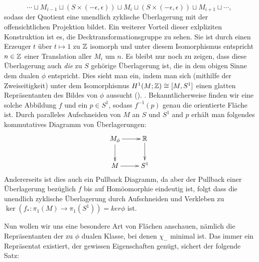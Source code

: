 \begin{bem}
	\[
		\cdots \sqcup M_{i-1} \sqcup (S \times (-\epsilon,\epsilon)) \sqcup M_i \sqcup  (S \times (-\epsilon,\epsilon)) \sqcup M_{i+1} \sqcup \cdots,
	\]
	sodass der Quotient eine unendlich zyklische Überlagerung mit der offensichtlichen Projektion bildet. Ein weiterer Vorteil dieser exlpliziten Konstruktion ist es, die Decktransformationsgruppe zu sehen. Sie ist durch einen Erzeuger $t$ über $t\mapsto 1$ zu $\mathbb{Z}$ isomorph und unter diesem Isomorphismus entspricht $n\in \mathbb{Z}$ einer Translation aller $M_i$ um $n$. Es bleibt nur noch zu zeigen, dass diese Überlagerung auch \textit{die} zu $S$ gehörige Überlagerung ist, die in dem obigen Sinne dem dualen $\phi$ entspricht. Dies sieht man ein, indem man sich (mithilfe der Zweiseitigkeit) unter dem Isomorphismus $H^1(M;\mathbb{Z})\cong [M,S^1]$ einen glatten Repräsentanten des Bildes von $\phi$ aussucht (). . Bekanntlicherweise finden wir eine solche Abbildung $f$ und ein $p \in S^1$, sodass $f^{-1}(p)$ genau die orientierte Fläche ist. Durch paralleles Aufschneiden von $M$ an $S$ und $S^1$ and $p$ erhält man folgendes kommutatives Diagramm von Überlagerungen:
	\[
		\begin{xy}
			\xymatrix{M_\phi \ar[r] \ar[d] &\RR \ar[d]\\
						M \ar[r]& S^1}
		\end{xy}
	\]
	Andererseits ist dies auch ein Pullback Diagramm, da aber der Pullback einer Überlagerung bezüglich $f$ bis auf Homöomorphie eindeutig ist, folgt dass die unendlich zyklische Überlagerung durch Aufschneiden und Verkleben zu $\ker(f_*:\pi_1(M)\to\pi_1(S^1)) = ker\phi$ ist.
\end{bem}

Nun wollen wir uns eine besondere Art von Flächen anschauen, nämlich die Repräsentanten der zu $\phi$ dualen Klasse, bei denen $\chi_-$ minimal ist. Das immer ein Repräsentat existiert, der gewissen Eigenschaften genügt, sichert der folgende Satz:

